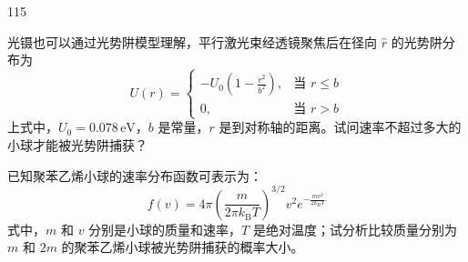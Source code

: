 \begin{problem}[第36届全国中学生物理竞赛决赛][光镊原理与实验分析]{115}
    \begin{subproblem}
        光镊也可以通过光势阱模型理解，平行激光束经透镜聚焦后在径向 $\hat{r}$ 的光势阱分布为
        \begin{equation}
            U(r) = \begin{cases}
                -U_{0}\left(1 - \frac{r^{2}}{b^{2}}\right), & \text{当 } r \leq b \\
                0, & \text{当 } r > b
            \end{cases}
        \end{equation}
        上式中，$U_{0}=0.078\,\mathrm{eV}$，$b$ 是常量，$r$ 是到对称轴的距离。试问速率不超过多大的小球才能被光势阱捕获？
    \end{subproblem}
    \begin{subproblem}
        已知聚苯乙烯小球的速率分布函数可表示为：
        \begin{equation}
            f(v) = 4\pi \left(\frac{m}{2\pi k_{\mathrm{B}} T}\right)^{3/2} v^{2} e^{- \frac{m v^{2}}{2 k_{\mathrm{B}} T}}
        \end{equation}
        式中，$m$ 和 $v$ 分别是小球的质量和速率，$T$ 是绝对温度；试分析比较质量分别为 $m$ 和 $2m$ 的聚苯乙烯小球被光势阱捕获的概率大小。
    \end{subproblem}
\end{problem}